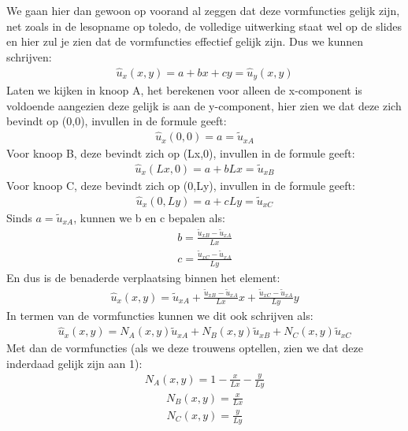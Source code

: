 \documentclass[a4paper,11pt,twoside]{report}
\begin{document}
We gaan hier dan gewoon op voorand al zeggen dat deze vormfuncties gelijk zijn, net zoals in de
lesopname op toledo, de volledige uitwerking staat wel op de slides en hier zul je zien dat de
vormfuncties effectief gelijk zijn. Dus we kunnen schrijven:
\begin{align*}
    \hat{u}_x(x,y) = a + bx + cy = \hat{u}_y(x,y)
\end{align*}
\newline
Laten we kijken in knoop A, het berekenen voor alleen de x-component is voldoende aangezien deze
gelijk is aan de y-component, hier zien we dat deze zich bevindt op (0,0), invullen in de formule
geeft:
\begin{align*}
    \hat{u}_x(0,0) = a = \tilde{u}_{xA}
\end{align*}
Voor knoop B, deze bevindt zich op (Lx,0), invullen in de formule geeft:
\begin{align*}
    \hat{u}_x(Lx,0) = a + bLx = \tilde{u}_{xB}
\end{align*}
Voor knoop C, deze bevindt zich op (0,Ly), invullen in de formule geeft:
\begin{align*}
    \hat{u}_x(0,Ly) = a + cLy = \tilde{u}_{xC}
\end{align*}
Sinds $a = \tilde{u}_{xA}$, kunnen we b en c bepalen als:
\begin{align*}
    b = \frac{\tilde{u}_{xB} - \tilde{u}_{xA}}{Lx}
\end{align*}
\begin{align*}
    c = \frac{\tilde{u}_{xC} - \tilde{u}_{xA}}{Ly}
\end{align*}
En dus is de benaderde verplaatsing binnen het element:
\begin{align*}
    \hat{u}_x(x,y) = \tilde{u}_{xA} + \frac{\tilde{u}_{xB} - \tilde{u}_{xA}}{Lx} x + \frac{\tilde{u}_{xC} - \tilde{u}_{xA}}{Ly} y
\end{align*}
In termen van de vormfuncties kunnen we dit ook schrijven als:
\begin{align*}
    \hat{u}_x(x,y) = N_A(x,y) \tilde{u}_{xA} + N_B(x,y) \tilde{u}_{xB} + N_C(x,y) \tilde{u}_{xC}
\end{align*}
Met dan de vormfuncties (als we deze trouwens optellen, zien we dat deze inderdaad gelijk zijn aan
1):
\begin{align*}
    N_A(x,y) = 1 - \frac{x}{Lx} - \frac{y}{Ly}
\end{align*}
\begin{align*}
    N_B(x,y) = \frac{x}{Lx}
\end{align*}
\begin{align*}
    N_C(x,y) = \frac{y}{Ly}
\end{align*}
\end{document}

